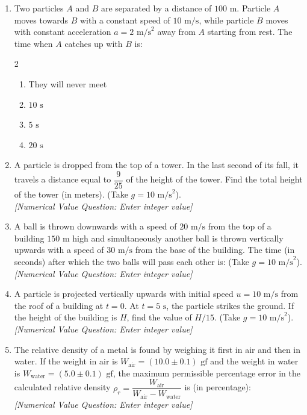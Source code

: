 \documentclass[11pt,a4paper]{article}
\begin{document}
\begin{enumerate}[label=\textbf{\textcolor{l3Crimson}{Q\arabic*.}},leftmargin=24pt,itemsep=10pt,start=51]
  \item Two particles $A$ and $B$ are separated by a distance of $100\text{ m}$. Particle $A$ moves towards $B$ with a constant speed of $10\text{ m/s}$, while particle $B$ moves with constant acceleration $a = 2\text{ m/s}^2$ away from $A$ starting from rest. The time when $A$ catches up with $B$ is:
  \begin{multicols}{2}
  \begin{enumerate}[label=\textbf{\textcolor{primaryDark}{(\Alph*)}},itemsep=2pt]
    \item They will never meet
    \item $10\text{ s}$
    \item $5\text{ s}$
    \item $20\text{ s}$
  \end{enumerate}
  \end{multicols}

  \item A particle is dropped from the top of a tower. In the last second of its fall, it travels a distance equal to $\dfrac{9}{25}$ of the height of the tower. Find the total height of the tower (in meters). (Take $g = 10\text{ m/s}^2$).\\
  \textit{[Numerical Value Question: Enter integer value]}

  \item A ball is thrown downwards with a speed of $20\text{ m/s}$ from the top of a building $150\text{ m}$ high and simultaneously another ball is thrown vertically upwards with a speed of $30\text{ m/s}$ from the base of the building. The time (in seconds) after which the two balls will pass each other is: (Take $g = 10\text{ m/s}^2$).\\
  \textit{[Numerical Value Question: Enter integer value]}

  \item A particle is projected vertically upwards with initial speed $u = 10\text{ m/s}$ from the roof of a building at $t = 0$. At $t = 5\text{ s}$, the particle strikes the ground. If the height of the building is $H$, find the value of $H / 15$. (Take $g = 10\text{ m/s}^2$).\\
  \textit{[Numerical Value Question: Enter integer value]}

  \item The relative density of a metal is found by weighing it first in air and then in water. If the weight in air is $W_{\text{air}} = (10.0 \pm 0.1)\text{ gf}$ and the weight in water is $W_{\text{water}} = (5.0 \pm 0.1)\text{ gf}$, the maximum permissible percentage error in the calculated relative density $\rho_r = \dfrac{W_{\text{air}}}{W_{\text{air}} - W_{\text{water}}}$ is (in percentage):\\
  \textit{[Numerical Value Question: Enter integer value]}


\end{enumerate}
\end{document}
